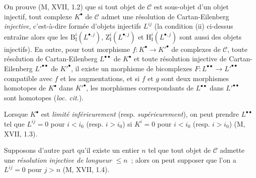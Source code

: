 \begin{env}[11.4.2]
On prouve (M, XVII, 1.2) que si tout objet de $\mathcal C$ est sous-objet
d'un objet injectif, tout complexe $K^\bullet$ de $\mathcal C$ admet une
résolution de Cartan-Eilenberg \emph{injective}, c'est-à-dire formée d'objets
injectifs $L^{ij}$ (la condition (ii) ci-dessus entraîne alors que les
$\mathrm B_{\mathrm I}^i(L^{\bullet,j})$,
$\mathrm Z_{\mathrm I}^i(L^{\bullet,j})$ et
$\mathrm H_{\mathrm I}^i(L^{\bullet,j})$ sont aussi des objets injectifs).
En outre, pour tout morphisme $f:K^\bullet\to K'^\bullet$ de complexes de
$\mathcal C$, toute résolution de Cartan-Eilenberg $L^{\bullet\bullet}$ de
$K^\bullet$ et toute résolution injective de Cartan-Eilenberg
$L'^{\bullet\bullet}$ de $K'^\bullet$, il existe un morphisme de bicomplexes
$F:L^{\bullet\bullet}\to L'^{\bullet\bullet}$ compatible avec $f$ et les
augmentations, et si $f$ et $g$ sont deux morphismes homotopes de $K^\bullet$
dans $K'^\bullet$, les morphismes correspondants de $L^{\bullet\bullet}$
dans $L'^{\bullet\bullet}$ sont homotopes (\emph{loc. cit.}).

Lorsque $K^\bullet$ est \emph{limité inférieurement} (resp.
\emph{supérieurement}), on peut prendre $L^{\bullet\bullet}$ tel que
$L^{ij}=0$ pour $i<i_0$ (resp. $i>i_0$) si $K^i=0$ pour $i<i_0$ (resp.
$i>i_0$) (M, XVII, 1.3).

Supposons d'autre part qu'il existe un entier $n$ tel que tout objet de
$\mathcal C$ admette une \emph{résolution injective de longueur $\leq n$}~;
alors on peut supposer que l'on a $L^{ij}=0$ pour $j>n$ (M, XVII, 1.4).
\end{env}

